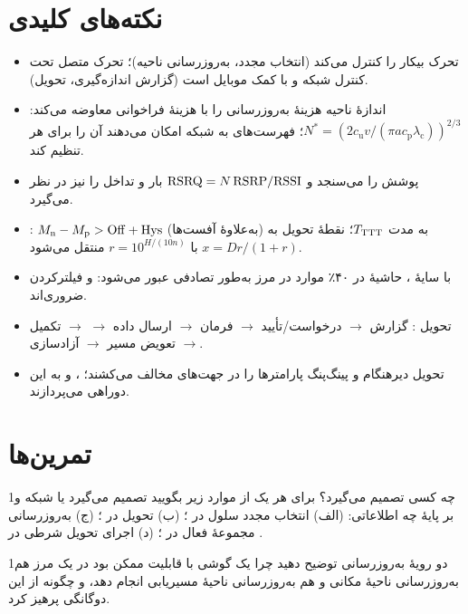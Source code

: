 \documentclass[11pt,a4paper]{article}
\begin{document}
\section{نکته‌های کلیدی}
\begin{takeawaybox}
\begin{itemize}
  \item تحرک بیکار را  کنترل می‌کند (انتخاب مجدد، به‌روزرسانی ناحیه)؛ تحرک متصل تحت کنترل شبکه
        و با کمک موبایل است (گزارش اندازه‌گیری، تحویل).
  \item اندازهٔ ناحیه هزینهٔ به‌روزرسانی را با هزینهٔ فراخوانی معاوضه می‌کند:
        $N^\ast = (2c_\mathrm{u}v/(\pi a c_\mathrm{p}\lambda_\mathrm{c}))^{2/3}$؛ فهرست‌های  به شبکه امکان
        می‌دهند آن را برای هر  تنظیم کند.
  \item {} پوشش را می‌سنجد و $\mathrm{RSRQ} = N\,\mathrm{RSRP}/\mathrm{RSSI}$ بار و تداخل را نیز در نظر می‌گیرد.
  \item {}: $M_\mathrm{n} - M_\mathrm{p} > \mathrm{Off} + \mathrm{Hys}$ (به‌علاوهٔ آفست‌ها) به مدت $T_{\mathrm{TTT}}$؛ نقطهٔ تحویل به
        $x = Dr/(1+r)$ با $r = 10^{H/(10n)}$ منتقل می‌شود.
  \item با سایهٔ ، حاشیهٔ  در ۴۰٪ موارد در مرز به‌طور تصادفی عبور می‌شود:  و
        فیلترکردن ضروری‌اند.
  \item تحویل : گزارش $\to$ درخواست/تأیید $\to$ فرمان $\to$ ارسال داده $\to$ 
        $\to$ تکمیل $\to$ تعویض مسیر $\to$ آزادسازی.
  \item تحویل دیرهنگام و پینگ‌پنگ پارامترها را در جهت‌های مخالف می‌کشند؛ ،  و
         به این دوراهی می‌پردازند.
\end{itemize}
\end{takeawaybox}

\section{تمرین‌ها}

\begin{exercisebox}{1}{چه کسی تصمیم می‌گیرد؟}\label{exr:who}
برای هر یک از موارد زیر بگویید  تصمیم می‌گیرد یا شبکه و بر پایهٔ چه اطلاعاتی: (الف) انتخاب
مجدد سلول در ؛ (ب) تحویل در ؛ (ج) به‌روزرسانی مجموعهٔ فعال در ؛
(د) اجرای تحویل شرطی در .
\end{exercisebox}

\begin{exercisebox}{1}{دو رویهٔ به‌روزرسانی}\label{exr:lara}
توضیح دهید چرا یک گوشی  با قابلیت  ممکن بود در یک مرز هم به‌روزرسانی ناحیهٔ
مکانی و هم به‌روزرسانی ناحیهٔ مسیریابی انجام دهد، و  چگونه از این دوگانگی پرهیز کرد.
\end{exercisebox}
\end{document}
